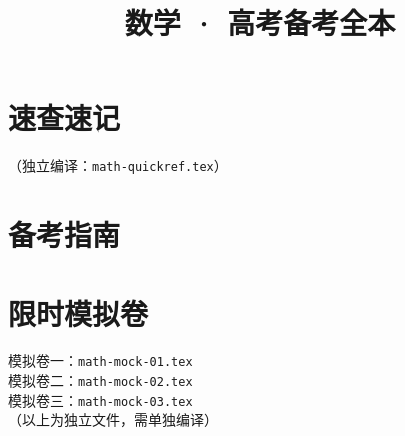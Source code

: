 \documentclass[12pt,a4paper]{ctexbook}
\title{\textbf{数学 · 高考备考全本}}
\date{}
\begin{document}
\maketitle
\tableofcontents

\part{速查速记}
（独立编译：\texttt{math-quickref.tex}）

\part{备考指南}





\part{限时模拟卷}
模拟卷一：\texttt{math-mock-01.tex}\\
模拟卷二：\texttt{math-mock-02.tex}\\
模拟卷三：\texttt{math-mock-03.tex}\\
（以上为独立文件，需单独编译）
\end{document}
